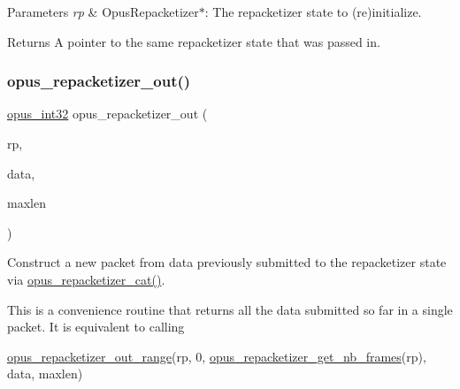 \begin{DoxyParams}{Parameters}
{\em rp} & {\ttfamily Opus\+Repacketizer$\ast$}\+: The repacketizer state to (re)initialize. \\
\hline
\end{DoxyParams}
\begin{DoxyReturn}{Returns}
A pointer to the same repacketizer state that was passed in. 
\end{DoxyReturn}
\mbox{\label{group__opus__repacketizer_ga19ff1e91a8fa652380f972a224a26481}} 
\subsubsection{\texorpdfstring{opus\+\_\+repacketizer\+\_\+out()}{opus\_repacketizer\_out()}}
{\footnotesize\ttfamily \hyperlink{opus__types_8h_aa4d309d6f80b99dbabebc8f98879ab9a}{opus\+\_\+int32} opus\+\_\+repacketizer\+\_\+out (\begin{DoxyParamCaption}\item[{\hyperlink{group__opus__repacketizer_ga1f85070a64bcbf5bf24f5ccb80323e7b}{Opus\+Repacketizer} $\ast$}]{rp,  }\item[{unsigned char $\ast$}]{data,  }\item[{\hyperlink{opus__types_8h_aa4d309d6f80b99dbabebc8f98879ab9a}{opus\+\_\+int32}}]{maxlen }\end{DoxyParamCaption})}



Construct a new packet from data previously submitted to the repacketizer state via \hyperlink{group__opus__repacketizer_ga2840dd56bfa37f8c6874355b9ce8fb46}{opus\+\_\+repacketizer\+\_\+cat()}. 

This is a convenience routine that returns all the data submitted so far in a single packet. It is equivalent to calling 
\begin{DoxyCode}
\hyperlink{group__opus__repacketizer_gac591b550d92125b4abfa11a4b609f51f}{opus\_repacketizer\_out\_range}(rp, 0, 
      \hyperlink{group__opus__repacketizer_ga2cad98d04458aafdf6bb9f22f34ea7c0}{opus\_repacketizer\_get\_nb\_frames}(rp),
                            data, maxlen)
\end{DoxyCode}
 
